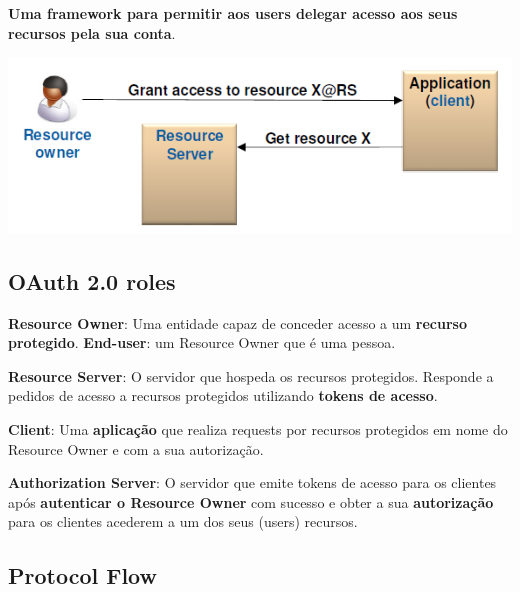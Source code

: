 \documentclass{article}
\begin{document}
\begin{flushleft}
  \textbf{Uma framework para permitir aos users delegar acesso aos
  seus recursos pela sua conta}.
\end{flushleft}

\begin{center}
  \includegraphics[scale=0.6]{28}
\end{center}

\subsection{OAuth 2.0 roles}

\begin{flushleft}
  \textbf{Resource Owner}: Uma entidade capaz de conceder acesso
  a um \textbf{recurso protegido}. \textbf{End-user}: um
  Resource Owner que é uma pessoa.

  \vspace{2mm}

  \textbf{Resource Server}: O servidor que hospeda os recursos protegidos.
  Responde a pedidos de acesso a recursos protegidos utilizando \textbf{tokens de acesso}.

  \vspace{2mm}

  \textbf{Client}: Uma \textbf{aplicação} que realiza requests por recursos protegidos
  em nome do Resource Owner e com a sua autorização.

  \vspace{2mm}

  \textbf{Authorization Server}: O servidor que emite tokens de acesso
  para os clientes após \textbf{autenticar o Resource Owner} com sucesso
  e obter a sua \textbf{autorização} para os clientes acederem a um dos seus
  (users) recursos.
\end{flushleft}

\subsection{Protocol Flow}
\end{document}
